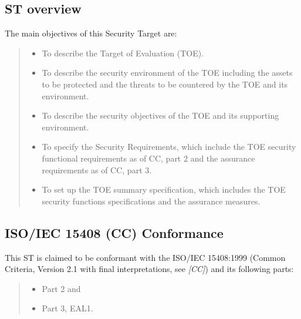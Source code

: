 \documentclass[10pt,a4paper,english]{article}
\begin{document}

\hypertarget{st-overview}{}
\subsection*{ST overview}

The main objectives of this Security Target are:
\begin{quote}
\begin{itemize}
\item {} 
To describe the Target of Evaluation (TOE).

\item {} 
To describe the security environment of the TOE including the assets to
be protected and the threats to be countered by the TOE and its
environment.

\item {} 
To describe the security objectives of the TOE and its supporting
environment.

\item {} 
To specify the Security Requirements, which include the TOE security
functional requirements as of CC, part 2 and the assurance requirements as
of CC, part 3.

\item {} 
To set up the TOE summary specification, which includes the TOE
security functions specifications and the assurance measures.

\end{itemize}
\end{quote}



\hypertarget{iso-iec-15408-cc-conformance}{}
\subsection*{ISO/IEC 15408 (CC) Conformance}

This ST is claimed to be conformant with the ISO/IEC 15408:1999 (Common
Criteria, Version 2.1 with final interpretations, see \emph{{[}CC]}) and its following
parts:
\begin{quote}
\begin{itemize}
\item {} 
Part 2 and

\item {} 
Part 3, EAL1.

\end{itemize}
\end{quote}
\end{document}
